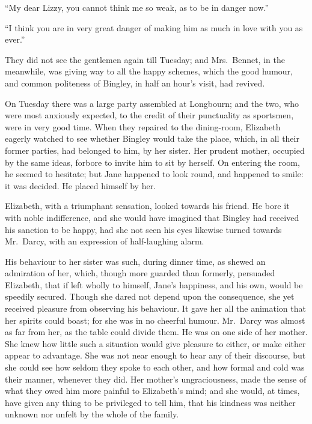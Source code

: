 “My dear Lizzy, you cannot think me so weak, as to
be in danger now.”

“I think you are in very great danger of making him
as much in love with you as ever.”

\strut

They did not see the gentlemen again till Tuesday;
and Mrs.\ Bennet, in the meanwhile, was giving way to all
the happy schemes, which the good humour, and common
politeness of Bingley, in half an hour’s visit, had revived.

On Tuesday there was a large party assembled at Longbourn;
and the two, who were most anxiously expected,
to the credit of their punctuality as sportsmen, were in
very good time. When they repaired to the dining-room,
Elizabeth eagerly watched to see whether Bingley
would take the place, which, in all their former parties,
had belonged to him, by her sister. Her prudent mother,
occupied by the same ideas, forbore to invite him to sit
by herself. On entering the room, he seemed to hesitate;
but Jane happened to look round, and happened to smile:
it was decided. He placed himself by her.

Elizabeth, with a triumphant sensation, looked towards
his friend. He bore it with noble indifference, and she
would have imagined that Bingley had received his
sanction to be happy, had she not seen his eyes likewise
turned towards Mr.\ Darcy, with an expression of half-laughing
alarm.

His behaviour to her sister was such, during dinner
time, as shewed an admiration of her, which, though more
guarded than formerly, persuaded Elizabeth, that if left
wholly to himself, Jane’s happiness, and his own, would
be speedily secured. Though she dared not depend upon
the consequence, she yet received pleasure from observing
his behaviour. It gave her all the animation that her
spirits could boast; for she was in no cheerful humour.
Mr.\ Darcy was almost as far from her, as the table could
divide them. He was on one side of her mother. She
knew how little such a situation would give pleasure to
either, or make either appear to advantage. She was not
near enough to hear any of their discourse, but she could
see how seldom they spoke to each other, and how formal
and cold was their manner, whenever they did. Her
mother’s ungraciousness, made the sense of what they
owed him more painful to Elizabeth’s mind; and she
would, at times, have given any thing to be privileged to
tell him, that his kindness was neither unknown nor unfelt
by the whole of the family.

